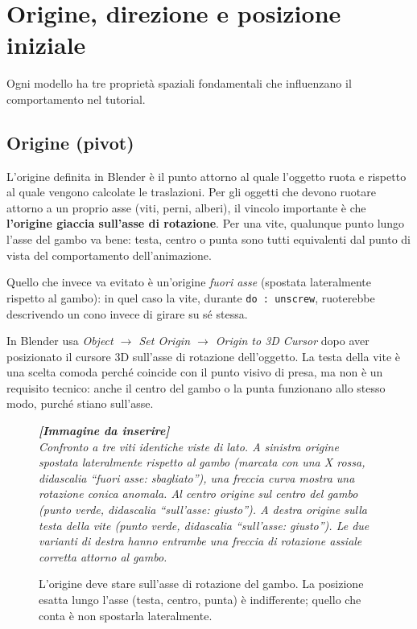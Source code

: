 ﻿\documentclass[a4paper,12pt,oneside]{book}
\newcommand{\kw}[1]{\texttt{\color{keycolor}#1}}
\newcommand{\imgph}[2]{%
  \begin{tcolorbox}[colback=cvtlightblue!30,colframe=cvtblue!40,%
    width=#1,halign=center,valign=center,height=5cm,boxrule=0.5pt,arc=3pt]%
    \textcolor{cvtgray}{\itshape\footnotesize\textbf{[Immagine da inserire]}\\[3pt]#2}%
  \end{tcolorbox}}
\begin{document}
\section{Origine, direzione e posizione iniziale}

Ogni modello ha tre proprietà spaziali fondamentali che influenzano il
comportamento nel tutorial.

\subsection{Origine (pivot)}

L'origine definita in Blender è il punto attorno al quale l'oggetto
ruota e rispetto al quale vengono calcolate le traslazioni. Per gli
oggetti che devono ruotare attorno a un proprio asse (viti, perni,
alberi), il vincolo importante è che \textbf{l'origine giaccia
sull'asse di rotazione}. Per una vite, qualunque punto lungo l'asse
del gambo va bene: testa, centro o punta sono tutti equivalenti dal
punto di vista del comportamento dell'animazione.

Quello che invece va evitato è un'origine \emph{fuori asse} (spostata
lateralmente rispetto al gambo): in quel caso la vite, durante \kw{do
: unscrew}, ruoterebbe descrivendo un cono invece di girare su sé
stessa.

\begin{trucchetto}
In Blender usa \emph{Object $\rightarrow$ Set Origin $\rightarrow$
Origin to 3D Cursor} dopo aver posizionato il cursore 3D sull'asse
di rotazione dell'oggetto. La testa della vite è una scelta comoda
perché coincide con il punto visivo di presa, ma non è un requisito
tecnico: anche il centro del gambo o la punta funzionano allo stesso
modo, purché stiano sull'asse.
\end{trucchetto}

\begin{figure}[H]
  \centering
  \imgph{11cm}{Confronto a tre viti identiche viste di lato. A sinistra origine spostata lateralmente rispetto al gambo (marcata con una X rossa, didascalia ``fuori asse: sbagliato''), una freccia curva mostra una rotazione conica anomala. Al centro origine sul centro del gambo (punto verde, didascalia ``sull'asse: giusto''). A destra origine sulla testa della vite (punto verde, didascalia ``sull'asse: giusto''). Le due varianti di destra hanno entrambe una freccia di rotazione assiale corretta attorno al gambo.}
  \caption{L'origine deve stare sull'asse di rotazione del gambo. La posizione esatta lungo l'asse (testa, centro, punta) è indifferente; quello che conta è non spostarla lateralmente.}
  \label{fig:origine-vite}
\end{figure}
\end{document}
